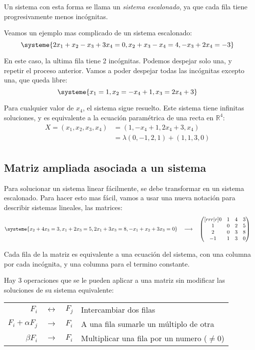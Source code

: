 \documentclass[../teoria.root.tex]{subfiles}
\begin{document}
Un sistema con esta forma se llama un \textit{sistema escalonado}, ya que cada
fila tiene progresivamente menos incógnitas.

Veamos un ejemplo mas complicado de un sistema escalonado:
\[\systeme{
	2x_1+x_2-x_3+3x_4=0,
	x_2+x_3-x_4=4,
	-x_3+2x_4=-3
}\]

En este caso, la ultima fila tiene 2 incógnitas. Podemos despejar solo una, y
repetir el proceso anterior. Vamos a poder despejar todas las incógnitas
excepto una, que queda libre:
\[\systeme{
	x_1=1,
	x_2=-x_4+1,
	x_3=2x_4+3
}\]

Para cualquier valor de $x_4$, el sistema sigue resuelto. Este sistema tiene
infinitas soluciones, y es equivalente a la ecuación paramétrica de una recta
en $\mathbb{R}^4$:
\begin{align*}
	X=(x_1,x_2,x_3,x_4)&=(1,-x_4+1,2x_4+3,x_4)\\
	&=\lambda(0,-1,2,1)+(1,1,3,0)\\
\end{align*}

\subsection{Matriz ampliada asociada a un sistema}

Para solucionar un sistema linear fácilmente, se debe transformar en un sistema
escalonado. Para hacer esto mas fácil, vamos a usar una nueva notación para
describir sistemas lineales, las matrices:
\[
	\systeme{x_2+4x_3=3,x_1+2x_3=5,2x_1+3x_3=8,-x_1+x_2+3x_3=0}
	\quad\longrightarrow\quad
	\begin{pmatrix}[rrr|r]
		 0 & 1 & 4 & 3\\
		 1 & 0 & 2 & 5\\
		 2 & 0 & 3 & 8\\
		-1 & 1 & 3 & 0
	\end{pmatrix}
\]

Cada fila de la matriz es equivalente a una ecuación del sistema, con una
columna por cada incógnita, y una columna para el termino constante.

Hay 3 operaciones que se le pueden aplicar a una matriz sin modificar las
soluciones de su sistema equivalente:

\begin{center}
	\begin{tabular}{rcll}
		$F_i$&$\leftrightarrow$&$F_j$&Intercambiar dos filas\\
		$F_i+\alpha F_j$&$\to$&$F_i$&A una fila sumarle un múltiplo de otra\\
		$\beta F_i$&$\to$&$F_i$&Multiplicar una fila por un numero ($\neq0$)
	\end{tabular}
\end{center}
\end{document}
